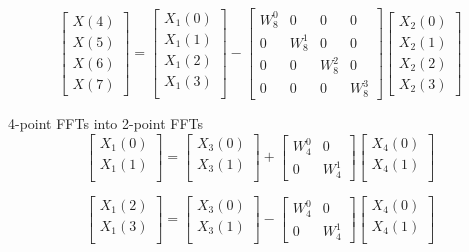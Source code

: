\documentclass[journal,12pt,twocolumn]{IEEEtran}
\renewcommand\thesection{\arabic{section}}
\begin{document}
\begin{enumerate}[label=\thesection.\arabic*]
\begin{equation}
\begin{bmatrix}
X(4) \\ 
X(5) \\ 
X(6) \\ 
X(7)
\end{bmatrix}
=
\begin{bmatrix}
X_{1}(0) \\ 
X_{1}(1)\\ 
X_{1}(2)\\
X_{1}(3)\\
\end{bmatrix}
-
\begin{bmatrix}
W^{0}_{8} & 0 & 0 & 0\\
0 & W^{1}_{8} & 0 & 0\\
0 & 0 & W^{2}_{8} & 0\\
0 & 0 & 0 & W^{3}_{8}
\end{bmatrix}
\begin{bmatrix}
X_{2}(0) \\ 
X_{2}(1) \\ 
X_{2}(2) \\
X_{2}(3)
\end{bmatrix}
\end{equation}

4-point FFTs into 2-point FFTs
\begin{equation}
\begin{bmatrix}
X_{1}(0) \\ 
X_{1}(1)\\ 
\end{bmatrix}
=
\begin{bmatrix}
X_{3}(0) \\ 
X_{3}(1)\\ 
\end{bmatrix}
+
\begin{bmatrix}
W^{0}_{4} & 0\\
0 & W^{1}_{4}
\end{bmatrix}
\begin{bmatrix}
X_{4}(0) \\ 
X_{4}(1) \\ 
\end{bmatrix}
\end{equation}

\begin{equation}
\begin{bmatrix}
X_{1}(2) \\ 
X_{1}(3)\\ 
\end{bmatrix}
=
\begin{bmatrix}
X_{3}(0) \\ 
X_{3}(1)\\ 
\end{bmatrix}
-
\begin{bmatrix}
W^{0}_{4} & 0\\
0 & W^{1}_{4}
\end{bmatrix}
\begin{bmatrix}
X_{4}(0) \\ 
X_{4}(1) \\ 
\end{bmatrix}
\end{equation}


\end{enumerate}
\end{document}
